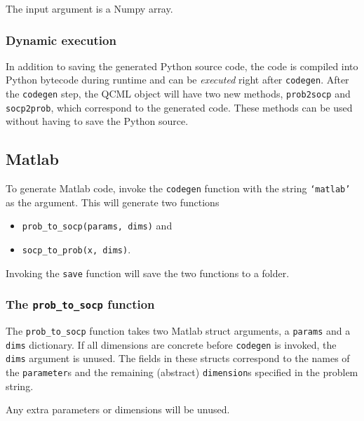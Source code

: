 \documentclass[11pt]{article}
\begin{document}
The input argument is a Numpy array.

\subsubsection{Dynamic execution}
In addition to saving the generated Python source code, the code is compiled
into Python bytecode during runtime and can be \emph{executed} right after
{\tt codegen}. After the {\tt codegen} step, the QCML object will have two
new methods, {\tt prob2socp} and {\tt socp2prob}, which correspond to the
generated code. These methods can be used without having to save the Python
source.

\subsection{Matlab}
To generate Matlab code, invoke the {\tt codegen} function with the string
{\tt `matlab'} as the argument. This will generate two functions
\begin{itemize}
\item {\tt prob\_to\_socp(params, dims)} and
\item {\tt socp\_to\_prob(x, dims)}.
\end{itemize}
Invoking the {\tt save} function will save the two functions to a folder.

\subsubsection{The {\tt prob\_to\_socp} function}
The {\tt prob\_to\_socp} function takes two Matlab struct
arguments, a {\tt params} and a {\tt dims} dictionary. If all dimensions are
concrete before {\tt codegen} is invoked, the {\tt dims} argument is unused.
The fields in these
structs correspond to the names of the {\tt parameter}s and the 
remaining (abstract)
{\tt dimension}s specified in the problem string.

Any extra parameters or dimensions will be unused. 
\end{document}
